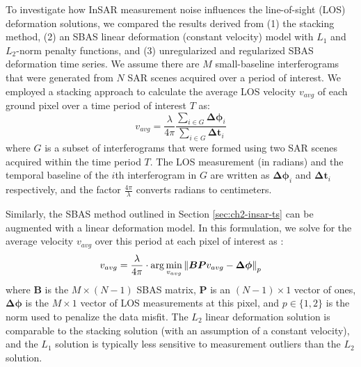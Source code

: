 To investigate how InSAR measurement noise influences the line-of-sight (LOS) deformation solutions, we compared the results derived from (1) the stacking method, (2) an SBAS linear deformation (constant velocity) model with $L_1$ and $L_2$-norm penalty functions, and (3) unregularized and regularized SBAS deformation time series. 
We assume there are $M$ small-baseline interferograms that were generated from $N$ SAR scenes acquired over a period of interest. 
We employed a stacking approach \citep{Sandwell1998PhaseGradientApproach} to calculate the average LOS velocity $v_{avg}$ of each ground pixel over a time period of interest $T$ as:
\begin{equation}
	v_{avg} = \frac{\lambda }{4 \pi}  \frac{ \sum_{i \in G} \bm{\Delta  \phi}_i}{\sum_{i \in G} \bm{\Delta t}_i}
	\label{eq:ch4-stacking}
\end{equation}
where $G$ is a subset of interferograms that were formed using two SAR scenes acquired within the time period $T$. The LOS measurement (in radians) and the temporal baseline of the $i$th interferogram in $G$ are written as $  \bm{\Delta  \phi}_i $ and $ \bm{\Delta t}_i $ respectively, and the factor $ \frac{4 \pi}{\lambda} $ converts radians to centimeters. 

Similarly, the SBAS method outlined in Section \ref{sec:ch2-insar-ts} can be augmented with a linear deformation model.
In this formulation, we solve for the average velocity $ v_{avg} $ over this period at each pixel of interest as \citep{Berardino2002NewAlgorithmSurface}:
\begin{equation}
		v_{avg} = \frac{\lambda }{4 \pi} \cdot \arg \min_{v_{avg}} \left\lVert \bm{BP} v_{avg} - \bm{\Delta \phi}   \right\rVert_p
	\label{eq:ch4-sbas-linear}
\end{equation}
where $ \bm{B }$ is the $ M \times (N-1) $ SBAS matrix, $ \bm{P}$ is an $ (N-1) \times 1 $ vector of ones, 
$ \bm{\Delta \phi} $ is the $ M \times 1 $ vector of LOS measurements at this pixel, 
and $ p \in \{1, 2\} $ is the norm used to penalize the data misfit. The $L_2$ linear deformation solution is comparable to the stacking solution (with an assumption of a constant velocity), and the $L_1$ solution is typically less sensitive to measurement outliers than the $L_2$ solution.

